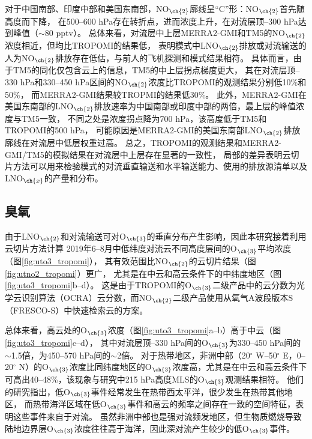对于中国南部、印度中部和美国东南部，NO$_{\ch{2}}$廓线呈“C”形：NO$_{\ch{2}}$首先随高度而下降，
在500--600 hPa存在转折点，进而浓度上升，在对流层顶--300 hPa达到峰值（$\sim$80 pptv）。
总体来看，对流层中上层MERRA2-GMI和TM5的NO$_{\ch{2}}$浓度相近，但均比TROPOMI的结果低，
表明模式中LNO$_{\ch{2}}$排放或对流输送的人为NO$_{\ch{2}}$排放存在低估，与前人的飞机探测和模式结果相符\citep{Laughner.2019a}。
具体而言，由于TM5的同化仅包含云上的信息，TM5的中上层拐点梯度更大，
其在对流层顶--330 hPa和330--450 hPa区间的NO$_{\ch{2}}$浓度比TROPOMI的观测结果分别低10\%和50\%，
而MERRA2-GMI结果较TROPMI的结果低30\%。
此外，MERRA2-GMI在美国东南部的LNO$_{\ch{2}}$排放速率为中国南部或印度中部的两倍，最上层的峰值浓度与TM5一致，
不同之处是浓度拐点降为700 hPa，该高度低于TM5和TROPOMI的500 hPa，
可能原因是MERRA2-GMI的美国东南部LNO$_{\ch{2}}$排放廓线在对流层中低层权重过高。
总之，TROPOMI的观测结果和MERRA2-GMI/TM5的模拟结果在对流层中上层存在显著的一致性，
局部的差异表明云切片方法可以用来检验模式的对流垂直输送和水平输送能力、使用的排放源清单以及LNO$_{\ch{x}}$的产量和分布。


\subsection{臭氧} \label{sec:o3_profile}

由于LNO$_{\ch{2}}$和对流输送可对O$_{\ch{3}}$的垂直分布产生影响，因此本研究接着利用云切片方法计算
2019年6--8月中低纬度对流云不同高度层间的O$_{\ch{3}}$平均浓度（图\ref{fig:uto3_tropomi}），
其有效范围比NO$_{\ch{2}}$的云切片结果（图\ref{fig:utno2_tropomi}）更广，
尤其是在中云和高云条件下的中纬度地区（图\ref{fig:uto3_tropomi}b--d）。
这是由于TROPOMI的O$_{\ch{3}}$二级产品中的云分数为光学云识别算法（OCRA）云分数，而NO$_{\ch{2}}$二级产品使用从氧气A波段版本S（FRESCO-S）中快速检索云的方案。

总体来看，高云处的O$_{\ch{3}}$浓度（图\ref{fig:uto3_tropomi}a--b）高于中云（图\ref{fig:uto3_tropomi}c--d），
其中对流层顶--330 hPa间的O$_{\ch{3}}$为330--450 hPa间的$\sim$1.5倍，为450--570 hPa间的$\sim$2倍。
对于热带地区，非洲中部（20$^{\circ}$ W--50$^{\circ}$ E，0--20$^{\circ}$ N）的O$_{\ch{3}}$浓度比同纬度地区的O$_{\ch{3}}$浓度高，尤其是在中云和高云条件下可高出40--48\%，该现象与\citet{Cooper.2013}研究中215 hPa高度MLS的O$_{\ch{3}}$观测结果相符。
他们的研究指出，低O$_{\ch{3}}$事件经常发生在热带西太平洋，很少发生在热带其他地区，
而热带海洋区域在低O$_{\ch{3}}$事件和高云的频率之间存在一致的空间特征，表明这些事件来自于对流。
虽然非洲中部也是强对流频发地区，但生物质燃烧导致陆地边界层O$_{\ch{3}}$浓度往往高于海洋\citep{Thompson.2001,Anderson.2016}，因此深对流产生较少的低O$_{\ch{3}}$事件。

